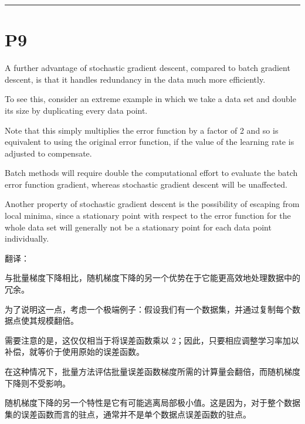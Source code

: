 \documentclass{article}
\begin{document}
\noindent\rule{\linewidth}{0.4pt}

\section{P9}

A further advantage of stochastic gradient descent, compared to batch gradient descent, is that it handles redundancy in the data much more efficiently. 

To see this, consider an extreme example in which we take a data set and double its size by duplicating every data point. 

Note that this simply multiplies the error function by a factor of 2 and so is equivalent to using the original error function, if the value of the learning rate is adjusted to compensate. 

Batch methods will require double the computational effort to evaluate the batch error function gradient, whereas stochastic gradient descent will be unaffected. 

Another property of stochastic gradient descent is the possibility of escaping from local minima, since a stationary point with respect to the error function for the whole data set will generally not be a stationary point for each data point individually.

{\color{red}
翻译：

与批量梯度下降相比，随机梯度下降的另一个优势在于它能更高效地处理数据中的冗余。

为了说明这一点，考虑一个极端例子：假设我们有一个数据集，并通过复制每个数据点使其规模翻倍。

需要注意的是，这仅仅相当于将误差函数乘以 2；因此，只要相应调整学习率加以补偿，就等价于使用原始的误差函数。

在这种情况下，批量方法评估批量误差函数梯度所需的计算量会翻倍，而随机梯度下降则不受影响。

随机梯度下降的另一个特性是它有可能逃离局部极小值。这是因为，对于整个数据集的误差函数而言的驻点，通常并不是单个数据点误差函数的驻点。
}
\end{document}
